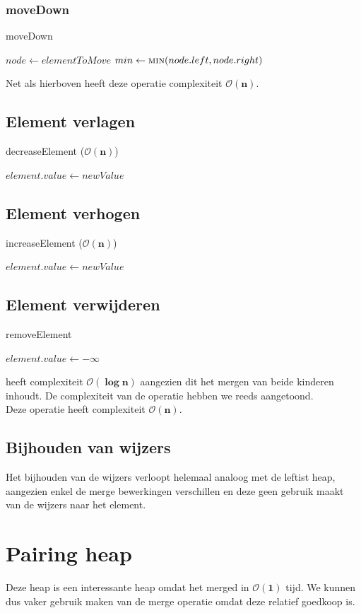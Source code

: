 \documentclass[a4paper,12pt]{report}
\newcommand{\bigO}[1]{$\bm{\mathcal{O}(#1)}$} %
\begin{document}
\subsubsection{moveDown}
\begin{algorithm}[H]
\caption{moveDown}
\SetAlgoLined	
\DontPrintSemicolon
$node \gets elementToMove$\;
$min \gets \Call{min}{node.left, node.right}$\;
\;
\;
\end{algorithm}
Net als hierboven heeft deze operatie complexiteit \bigO{n}.
\subsection{Element verlagen}
\begin{algorithm}[H]
\caption{decreaseElement (\bigO{n})}
\SetAlgoLined	
\DontPrintSemicolon
$element.value \gets newValue$\;
\end{algorithm}
\subsection{Element verhogen}
\begin{algorithm}[H]
\caption{increaseElement (\bigO{n})}
\SetAlgoLined	
\DontPrintSemicolon
$element.value \gets newValue$\;
\end{algorithm}
\subsection{Element verwijderen}
\begin{algorithm}[H]
\caption{removeElement}
\SetAlgoLined	
\DontPrintSemicolon
$element.value \gets -\infty$\;
\;
\;
\end{algorithm}
 heeft complexiteit \bigO{\log n} aangezien dit het mergen van beide kinderen inhoudt. De complexiteit van de  operatie hebben we reeds aangetoond. \\
Deze operatie heeft complexiteit \bigO{n}.
\subsection{Bijhouden van wijzers}
Het bijhouden van de wijzers verloopt helemaal analoog met de leftist heap, aangezien enkel de merge bewerkingen verschillen en deze geen gebruik maakt van de wijzers naar het element.
\newpage
\section{Pairing heap}
Deze heap is een interessante heap omdat het merged in \bigO{1} tijd. We kunnen dus vaker gebruik maken van de merge operatie omdat deze relatief goedkoop is.
\end{document}
